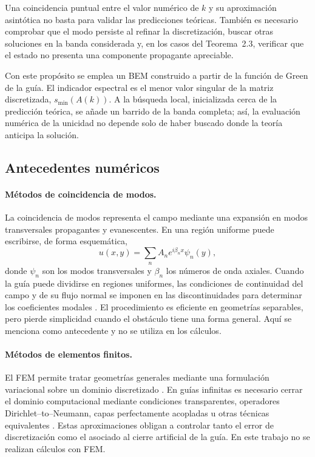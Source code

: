 \documentclass[11pt]{article}
\begin{document}
Una coincidencia puntual entre el valor numérico de \(k\) y su aproximación asintótica no basta para validar las predicciones teóricas. También es necesario comprobar que el modo persiste al refinar la discretización, buscar otras soluciones en la banda considerada y, en los casos del Teorema~2.3, verificar que el estado no presenta una componente propagante apreciable.

Con este propósito se emplea un BEM construido a partir de la función de Green de la guía. El indicador espectral es el menor valor singular de la matriz discretizada, \(s_{\min}(A(k))\). A la búsqueda local, inicializada cerca de la predicción teórica, se añade un barrido de la banda completa; así, la evaluación numérica de la unicidad no depende solo de haber buscado donde la teoría anticipa la solución.

\subsection{Antecedentes numéricos}

\paragraph{Métodos de coincidencia de modos.}
La coincidencia de modos representa el campo mediante una expansión en modos transversales propagantes y evanescentes. En una región uniforme puede escribirse, de forma esquemática,
\begin{equation}
u(x,y)=\sum_n A_n e^{i\beta_nx}\psi_n(y),
\end{equation}
donde \(\psi_n\) son los modos transversales y \(\beta_n\) los números de onda axiales. Cuando la guía puede dividirse en regiones uniformes, las condiciones de continuidad del campo y de su flujo normal se imponen en las discontinuidades para determinar los coeficientes modales \cite{Klaren1994,FahyWalker2004}. El procedimiento es eficiente en geometrías separables, pero pierde simplicidad cuando el obstáculo tiene una forma general. Aquí se menciona como antecedente y no se utiliza en los cálculos.

\paragraph{Métodos de elementos finitos.}
El FEM permite tratar geometrías generales mediante una formulación variacional sobre un dominio discretizado \cite{Ihlenburg1998}. En guías infinitas es necesario cerrar el dominio computacional mediante condiciones transparentes, operadores Dirichlet--to--Neumann, capas perfectamente acopladas u otras técnicas equivalentes \cite{Harari1998}. Estas aproximaciones obligan a controlar tanto el error de discretización como el asociado al cierre artificial de la guía. En este trabajo no se realizan cálculos con FEM.
\end{document}
